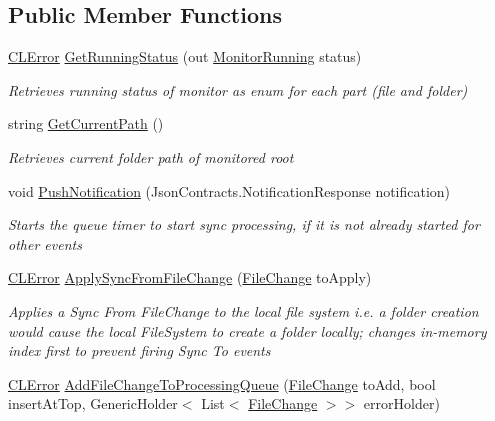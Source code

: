 \subsection*{Public Member Functions}
\begin{DoxyCompactItemize}
\item 
\hyperlink{class_cloud_api_public_1_1_model_1_1_c_l_error}{C\-L\-Error} \hyperlink{class_file_monitor_1_1_monitor_agent_a403fa6683404f0cbb5338aa0ab49c627}{Get\-Running\-Status} (out \hyperlink{namespace_cloud_api_public_1_1_static_a502726756c6bc84b5c9bcaf23c3a8d28}{Monitor\-Running} status)
\begin{DoxyCompactList}\small\item\em Retrieves running status of monitor as enum for each part (file and folder) \end{DoxyCompactList}\item 
string \hyperlink{class_file_monitor_1_1_monitor_agent_a44eb388d08ba68f98b694669af80505b}{Get\-Current\-Path} ()
\begin{DoxyCompactList}\small\item\em Retrieves current folder path of monitored root \end{DoxyCompactList}\item 
void \hyperlink{class_file_monitor_1_1_monitor_agent_a1ae703e313f2cf84f0fa7a45ae89f5b7}{Push\-Notification} (Json\-Contracts.\-Notification\-Response notification)
\begin{DoxyCompactList}\small\item\em Starts the queue timer to start sync processing, if it is not already started for other events \end{DoxyCompactList}\item 
\hyperlink{class_cloud_api_public_1_1_model_1_1_c_l_error}{C\-L\-Error} \hyperlink{class_file_monitor_1_1_monitor_agent_af2432c237a967c6dfcd8e0127b7590e9}{Apply\-Sync\-From\-File\-Change} (\hyperlink{class_cloud_api_public_1_1_model_1_1_file_change}{File\-Change} to\-Apply)
\begin{DoxyCompactList}\small\item\em Applies a Sync From File\-Change to the local file system i.\-e. a folder creation would cause the local File\-System to create a folder locally; changes in-\/memory index first to prevent firing Sync To events \end{DoxyCompactList}\item 
\hyperlink{class_cloud_api_public_1_1_model_1_1_c_l_error}{C\-L\-Error} \hyperlink{class_file_monitor_1_1_monitor_agent_a6e726640dd1256258d2de207193563f4}{Add\-File\-Change\-To\-Processing\-Queue} (\hyperlink{class_cloud_api_public_1_1_model_1_1_file_change}{File\-Change} to\-Add, bool insert\-At\-Top, Generic\-Holder$<$ List$<$ \hyperlink{class_cloud_api_public_1_1_model_1_1_file_change}{File\-Change} $>$$>$ error\-Holder)
$$
\end{DoxyCompactItemize}
